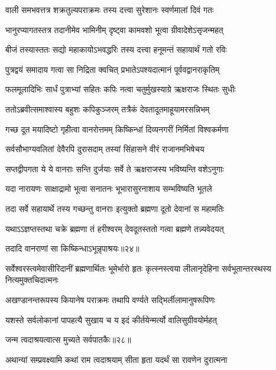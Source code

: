 \twolineshloka
{वाली समभवत्तत्र शक्रतुल्यपराक्रमः}
{तस्य दत्त्वा सुरेशानः स्वर्णमालां दिवं गतः} %

\twolineshloka
{भानुरप्यागतस्तत्र तदानीमेव भामिनीम्}
{दृष्ट्वा कामवशो भूत्वा ग्रीवादेशेऽसृजन्महत्} %

\twolineshloka
{बीजं तस्यास्ततः सद्यो महाकायोऽभवद्धरिः}
{तस्य दत्त्वा हनूमन्तं सहायार्थं गतो रविः} %

\twolineshloka
{पुत्रद्वयं समादाय गत्वा सा निद्रिता क्वचित्}
{प्रभातेऽपश्यदात्मानं पूर्ववद्वानराकृतिम्} %

\twolineshloka
{फलमूलादिभिः सार्धं पुत्राभ्यां सहितः कपिः}
{नत्वा चतुर्मुखस्याग्रे ऋक्षराजः स्थितः सुधीः} %

\twolineshloka
{ततोऽब्रवीत्समाश्वास्य बहुशः कपिकुञ्जरम्}
{तत्रैकं देवतादूतमाहूयामरसन्निभम्} %

\twolineshloka
{गच्छ दूत मयादिष्टो गृहीत्वा वानरोत्तमम्}
{किष्किन्धां दिव्यनगरीं निर्मितां विश्वकर्मणा} %

\twolineshloka
{सर्वसौभाग्यवलितां देवैरपि दुरासदाम्}
{तस्यां सिंहासने वीरं राजानमभिषेचय} %

\twolineshloka
{सप्तद्वीपगता ये ये वानराः सन्ति दुर्जयाः}
{सर्वे ते ऋक्षराजस्य भविष्यन्ति वशेऽनुगाः} %

\twolineshloka
{यदा नारायणः साक्षाद्रामो भूत्वा सनातनः}
{भूभारासुरनाशाय सम्भविष्यति भूतले} %

\twolineshloka
{तदा सर्वे सहायार्थे तस्य गच्छन्तु वानराः}
{इत्युक्तो ब्रह्मणा दूतो देवानां स महामतिः} %

\twolineshloka
{यथाऽऽज्ञप्तस्तथा चक्रे ब्रह्मणा तं हरीश्वरम्}
{देवदूतस्ततो गत्वा ब्रह्मणे तन्न्यवेदयत्} %

{तदादि वानराणां सा किष्किन्धाऽभून्नृपाश्रयः॥२४॥} %


\threelineshloka
{सर्वेश्वरस्त्वमेवासीरिदानीं ब्रह्मणार्थितः}
{भूमेर्भारो हृतः कृत्स्नस्त्वया लीलानृदेहिना}
{सर्वभूतान्तरस्थस्य नित्यमुक्तचिदात्मनः} %

\twolineshloka
{अखण्डानन्तरूपस्य कियानेष पराक्रमः}
{तथापि वर्ण्यते सद्भिर्लीलामानुषरूपिणः} %

\twolineshloka
{यशस्ते सर्वलोकानां पापहत्यै सुखाय च}
{य इदं कीर्तयेन्मर्त्यो वालिसुग्रीवयोर्महत्} %

{जन्म त्वदाश्रयत्वात्स मुच्यते सर्वपातकैः॥२८॥} %


\twolineshloka
{अथान्यां सम्प्रवक्ष्यामि कथां राम त्वदाश्रयाम्}
{सीता हृता यदर्थं सा रावणेन दुरात्मना} %

